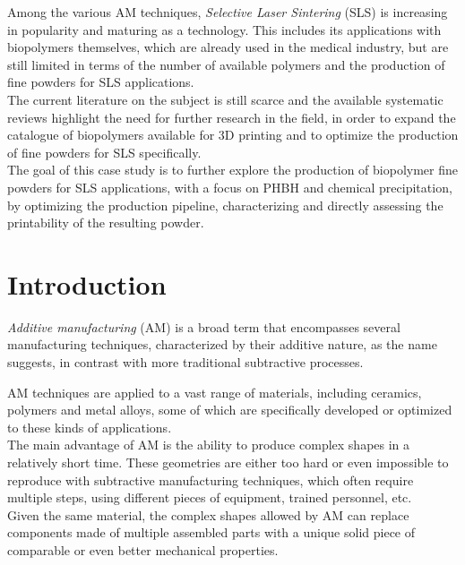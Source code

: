 \documentclass{article}
\begin{document}
    Among the various AM techniques, \textit{Selective Laser Sintering} (SLS) is increasing in popularity and 
    maturing as a technology. This includes its applications with biopolymers themselves, which are already used in the medical industry, 
    but are still limited in terms of the number of available polymers and the production of fine powders for SLS applications. \\ 

    The current literature on the subject is still scarce and the available systematic reviews highlight the need for further research in the field, 
    in order to expand the catalogue of biopolymers available for 3D printing and to optimize the production of fine powders
    for SLS specifically. \\

    The goal of this case study is to further explore the production of biopolymer fine powders for SLS applications, with a focus on 
    PHBH and chemical precipitation, by optimizing the production pipeline, characterizing and directly assessing 
    the printability of the resulting powder. \\  

    \clearpage
    \section{Introduction\label{Intro}}

    \textit{Additive manufacturing} (AM) is a broad term that encompasses several manufacturing techniques, characterized by their additive nature, as the name suggests, 
    in contrast with more traditional subtractive processes.
    
    AM techniques are applied to a vast range of materials, including ceramics, polymers and metal alloys, some of which are specifically developed or optimized to 
    these kinds of applications. \\ 
    
    The main advantage of AM is the ability to produce complex shapes in a relatively short time. 
    These geometries are either too hard or even impossible to reproduce with subtractive manufacturing techniques, which often require multiple steps, using different 
    pieces of equipment, trained personnel, etc. \\

    Given the same material, the complex shapes allowed by AM can replace components made of multiple assembled parts with a unique solid piece of comparable or even better mechanical properties. 
    
\end{document}
